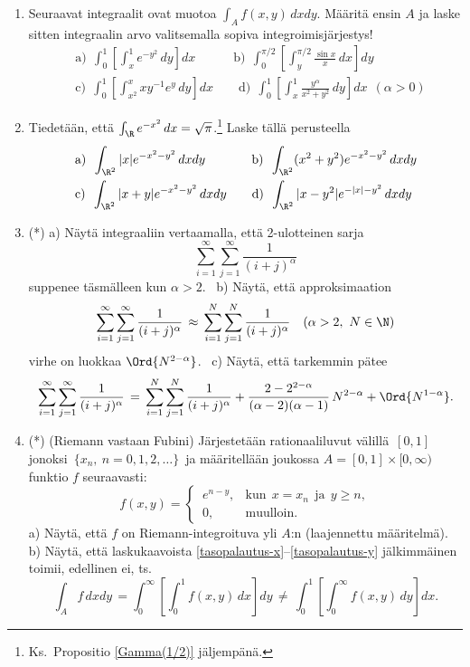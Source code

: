 \begin{enumerate}
\item
Seuraavat integraalit ovat muotoa $\int_A f(x,y)\, dxdy$. Määritä ensin $A$ ja laske sitten
integraalin arvo valitsemalla sopiva integroimisjärjestys!
\begin{align*}
&\text{a)}\ \ \int_0^1\left[\int_x^1 e^{-y^2}\,dy\right]dx \qquad\quad
 \text{b)}\ \ \int_0^{\pi/2}\left[\int_y^{\pi/2} \frac{\sin x}{x}\,dx\right]dy \\
&\text{c)}\ \ \int_0^1\left[\int_{x^2}^x xy^{-1}e^y\,dy\right]dx \qquad
 \text{d)}\ \ \int_0^1\left[\int_x^1 \frac{y^\alpha}{x^2+y^2}\,dy\right]dx\ \ (\alpha>0)
\end{align*}

\item
Tiedetään, että $\int_\R e^{-x^2}\,dx=\sqrt{\pi}$.\footnote[2]{Ks.\ Propositio \ref{Gamma(1/2)}
jäljempänä.} Laske tällä perusteella
\begin{align*}
&\text{a)}\,\ \int_{\R^2} |x|e^{-x^2-y^2}\,dxdy \qquad\quad\ \
 \text{b)}\,\ \int_{\R^2} (x^2+y^2)e^{-x^2-y^2}\,dxdy \\
&\text{c)}\,\ \int_{\R^2} |x+y|e^{-x^2-y^2}\,dxdy \qquad
 \text{d)}\,\ \int_{\R^2} |x-y^2|e^{-|x|-y^2}\,dxdy
\end{align*}

\item (*)
a) Näytä integraaliin vertaamalla, että 2-ulotteinen sarja
\[
\sum_{i=1}^\infty\sum_{j=1}^\infty \frac{1}{(i+j)^\alpha}
\]
suppenee täsmälleen kun $\alpha>2$. \ b) Näytä, että approksimaation
\[
\sum_{i=1}^\infty\sum_{j=1}^\infty \frac{1}{(i+j)^\alpha} \,\approx\,
\sum_{i=1}^N\sum_{j=1}^N \frac{1}{(i+j)^\alpha} \quad (\alpha>2,\ N\in\N)
\]
virhe on luokkaa $\Ord{N^{2-\alpha}}$. \ c) Näytä, että tarkemmin pätee
\[
\sum_{i=1}^\infty\sum_{j=1}^\infty \frac{1}{(i+j)^\alpha} \,=\,
\sum_{i=1}^N\sum_{j=1}^N \frac{1}{(i+j)^\alpha} +
\frac{2-2^{2-\alpha}}{(\alpha-2)(\alpha-1)}\,N^{2-\alpha} + \Ord{N^{1-\alpha}}.
\]

\item (*) \label{Riemann vs Fubini} 
(Riemann vastaan Fubini) Järjestetään rationaaliluvut välillä $\,[0,1]\,$ jonoksi
$\,\{ x_n,\ n = 0, 1, 2, \ldots \}\,$ ja määritellään joukossa $A = [0,1] \times [0, \infty)$
funktio $f$ seuraavasti:
\[
f(x,y) = \begin{cases} 
         \,e^{n-y}, &\text{kun}\ \ x = x_n\ \ \text{ja}\ \ y \ge n, \\ \,0, &\text{muulloin}.
         \end{cases}
\]
a) Näytä, että $f$ on Riemann-integroituva yli $A$:n (laajennettu määritelmä).
b) Näytä, että laskukaavoista \eqref{tasopalautus-x}--\eqref{tasopalautus-y} jälkimmäinen
toimii, edellinen ei, ts. 
\[
\int_A f\,dx dy\, = \int_0^\infty \left[\int_0^1 f(x, y)\,dx \right] dy\, \neq \, 
                    \int_0^1 \left[\int_0^\infty f(x, y)\,dy \right] dx.
\]

\end{enumerate}